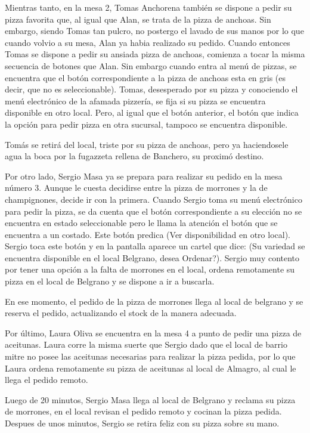 \documentclass[a4paper,10pt]{article}
\begin{document}
Mientras tanto, en la mesa 2, Tomas Anchorena tambi\'en se dispone a pedir su pizza favorita que, al igual que Alan, se trata de la pizza de 
anchoas. Sin embargo, siendo Tomas tan pulcro, no postergo el lavado de sus manos por lo que cuando volvio a su mesa, Alan ya habia realizado
su pedido. Cuando entonces Tomas se dispone a pedir su ansiada pizza de anchoas, comienza a tocar la misma secuencia de botones que Alan. Sin embargo
cuando entra al men\'u de pizzas, se encuentra que el bot\'on correspondiente a la pizza de anchoas esta en gris (es decir, que no es seleccionable).
Tomas, desesperado por su pizza y conociendo el men\'u electr\'onico de la afamada pizzer\'ia, se fija si su pizza se encuentra disponible en otro
local. Pero, al igual que el bot\'on anterior, el bot\'on que indica la opci\'on para pedir pizza en otra sucursal, tampoco se encuentra disponible.

Tom\'as se retir\'a del local, triste por su pizza de anchoas, pero ya haciendosele agua la boca por la fugazzeta rellena de Banchero, su proxim\'o destino.

Por otro lado, Sergio Masa ya se prepara para realizar su pedido en la mesa n\'umero 3. Aunque le cuesta decidirse entre la pizza de morrones
y la de champignones, decide ir con la primera. Cuando Sergio toma su men\'u electr\'onico para pedir la pizza, se da cuenta que el bot\'on 
correspondiente a su elecci\'on no se encuentra en estado seleccionable pero le llama la atenci\'on el bot\'on que se encuentra a un costado. Este
bot\'on predica (Ver disponibilidad en otro local). Sergio toca este bot\'on y en la pantalla aparece un cartel que dice: (Su variedad se encuentra
disponible en el local Belgrano, desea Ordenar?). Sergio muy contento por tener una opci\'on a la falta de morrones en el local, ordena remotamente su pizza
en el local de Belgrano y se dispone a ir a buscarla. 

En ese momento, el pedido de la pizza de morrones llega al local de belgrano y se reserva el pedido, actualizando el stock de la manera adecuada.

Por \'ultimo, Laura Oliva se encuentra en la mesa 4 a punto de pedir una pizza de aceitunas. Laura corre la misma suerte que Sergio dado que el local
de barrio mitre no posee las aceitunas necesarias para realizar la pizza pedida, por lo que Laura ordena remotamente su pizza de aceitunas al local de
Almagro, al cual le llega el pedido remoto.


Luego de 20 minutos, Sergio Masa llega al local de Belgrano y reclama su pizza de morrones, en el local revisan el pedido remoto y cocinan la pizza
pedida. Despues de unos minutos, Sergio se retira feliz con su pizza sobre su mano. 
\end{document}
